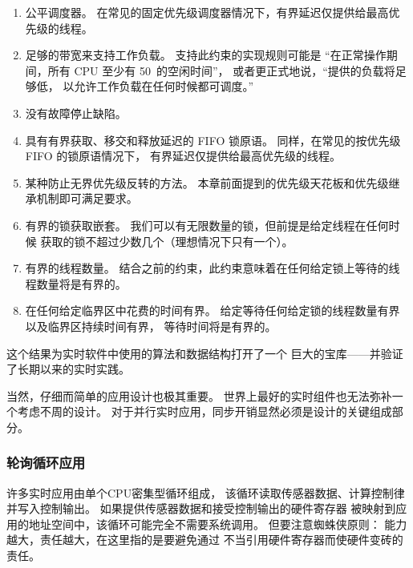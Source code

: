 \begin{enumerate}
\item	公平调度器。
	在常见的固定优先级调度器情况下，有界延迟仅提供给最高优先级的线程。
\item	足够的带宽来支持工作负载。
	支持此约束的实现规则可能是
	``在正常操作期间，所有 CPU 至少有 50\pct\ 的空闲时间''，
	或者更正式地说，``提供的负载将足够低，
	以允许工作负载在任何时候都可调度。''
\item	没有故障停止缺陷。
\item	具有有界获取、移交和释放延迟的 FIFO 锁原语。
	同样，在常见的按优先级 FIFO 的锁原语情况下，
	有界延迟仅提供给最高优先级的线程。
\item	某种防止无界优先级反转的方法。
	本章前面提到的优先级天花板和优先级继承机制即可满足要求。
\item	有界的锁获取嵌套。
	我们可以有无限数量的锁，但前提是给定线程在任何时候
	获取的锁不超过少数几个（理想情况下只有一个）。
\item	有界的线程数量。
	结合之前的约束，此约束意味着在任何给定锁上等待的线程数量将是有界的。
\item	在任何给定临界区中花费的时间有界。
	给定等待任何给定锁的线程数量有界以及临界区持续时间有界，
	等待时间将是有界的。
\end{enumerate}

\QuickQuizEnd

这个结果为实时软件中使用的算法和数据结构打开了一个
巨大的宝库——并验证了长期以来的实时实践。

当然，仔细而简单的应用设计也极其重要。
世界上最好的实时组件也无法弥补一个考虑不周的设计。
对于并行实时应用，同步开销显然必须是设计的关键组成部分。

\subsubsection{轮询循环应用}
\label{sec:advsync:Polling-Loop Applications}

许多实时应用由单个CPU密集型循环组成，
该循环读取传感器数据、计算控制律并写入控制输出。
如果提供传感器数据和接受控制输出的硬件寄存器
被映射到应用的地址空间中，该循环可能完全不需要系统调用。
但要注意蜘蛛侠原则：
能力越大，责任越大，在这里指的是要避免通过
不当引用硬件寄存器而使硬件变砖的责任。

